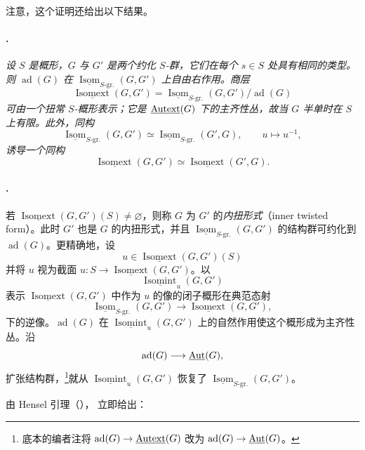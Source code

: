 注意，这个证明还给出以下结果。
\paragraph{.}
\emph{设 \(S\) 是概形，\(G\) 与 \(G'\) 是两个约化 \(S\)-群，它们在每个 \(s\in S\) 处具有相同的类型。则 \(\operatorname{ad}(G)\) 在 \(\underline{\operatorname{Isom}}_{S\text{-}\mathrm{gr.}}(G,G')\) 上自由右作用。商层}
\[
  \underline{\operatorname{Isomext}}(G,G')
  =
  \underline{\operatorname{Isom}}_{S\text{-}\mathrm{gr.}}(G,G')
  /\operatorname{ad}(G)
\]
\emph{可由一个扭常 \(S\)-概形表示；它是 \(\underline{\operatorname{Autext}}(G)\) 下的主齐性丛，故当 \(G\) 半单时在 \(S\) 上有限。此外，同构}
\[
  \underline{\operatorname{Isom}}_{S\text{-}\mathrm{gr.}}(G,G')
  \simeq
  \underline{\operatorname{Isom}}_{S\text{-}\mathrm{gr.}}(G',G),
  \qquad u\longmapsto u^{-1},
\]
\emph{诱导一个同构}
\[
  \underline{\operatorname{Isomext}}(G,G')
  \simeq
  \underline{\operatorname{Isomext}}(G',G).
\]

\paragraph{.}
若 \(\underline{\operatorname{Isomext}}(G,G')(S)\neq\varnothing\)，则称 \(G\) 为 \(G'\) 的\emph{内扭形式}（inner twisted form）。此时 \(G'\) 也是 \(G\) 的内扭形式，并且 \(\underline{\operatorname{Isom}}_{S\text{-}\mathrm{gr.}}(G,G')\) 的结构群可约化到 \(\operatorname{ad}(G)\)。更精确地，设
\[
  u\in\underline{\operatorname{Isomext}}(G,G')(S)
\]
并将 \(u\) 视为截面 \(u:S\to\underline{\operatorname{Isomext}}(G,G')\)。以
\[
  \underline{\operatorname{Isomint}}_u(G,G')
\]
表示 \(\underline{\operatorname{Isomext}}(G,G')\) 中作为 \(u\) 的像的闭子概形在典范态射
\[
  \underline{\operatorname{Isom}}_{S\text{-}\mathrm{gr.}}(G,G')
  \longrightarrow
  \underline{\operatorname{Isomext}}(G,G'),
\]
下的逆像。\(\operatorname{ad}(G)\) 在 \(\underline{\operatorname{Isomint}}_u(G,G')\) 上的自然作用使这个概形成为主齐性丛。沿
\[
  \operatorname{ad}(G)\longrightarrow\underline{\operatorname{Aut}}(G),
\]
扩张结构群，\footnote{底本的编者注将 \(\operatorname{ad}(G)\to\underline{\operatorname{Autext}}(G)\) 改为 \(\operatorname{ad}(G)\to\underline{\operatorname{Aut}}(G)\)。}就从 \(\underline{\operatorname{Isomint}}_u(G,G')\) 恢复了 \(\underline{\operatorname{Isom}}_{S\text{-}\mathrm{gr.}}(G,G')\)。

由 Hensel 引理（）， 立即给出：

